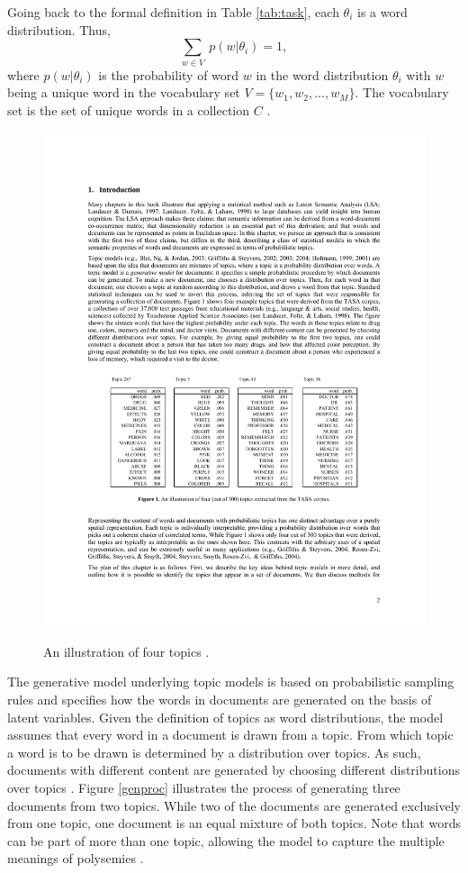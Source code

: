 \documentclass[11pt,a4paper,english,oneside]{book}
\numberwithin{equation}{chapter}
\begin{document}
Going back to the formal definition in Table \ref{tab:task}, each $\theta_i$ is a word distribution. Thus,
$$
\underset{w \in V}{\sum} \ p(w | \theta_i) = 1,
$$
where $p(w | \theta_i)$ is the probability of word $w$ in the word distribution $\theta_i$ with $w$ being a unique word in the vocabulary set $V = \{w_1, w_2, ..., w_M\}$. The vocabulary set is the set of unique words in a collection $C$ \cite[pp.~338]{Zhai.2016}.

\begin{figure}
	\caption{An illustration of four topics \cite[p.2]{Steyvers(2007)}.}
	\centering
	\includegraphics[scale=1]{Images/SteyversGriffithsTopics.pdf}
	\label{fourtopics}
\end{figure}

The generative model underlying topic models is based on probabilistic sampling rules and specifies how the words in documents are generated on the basis of latent variables. Given the definition of topics as word distributions, the model assumes that every word in a document is drawn from a topic. From which topic a word is to be drawn is determined by a distribution over topics. As such, documents with different content are generated by choosing different distributions over topics \cite[~p. 2--3]{Steyvers(2007)}. Figure \ref{genproc} illustrates the process of generating three documents from two topics. While two of the documents are generated exclusively from one topic, one document is an equal mixture of both topics. Note that words can be part of more than one topic, allowing the model to capture the multiple meanings of polysemies \cite[~p. 2--3]{Steyvers(2007)}.
\end{document}
